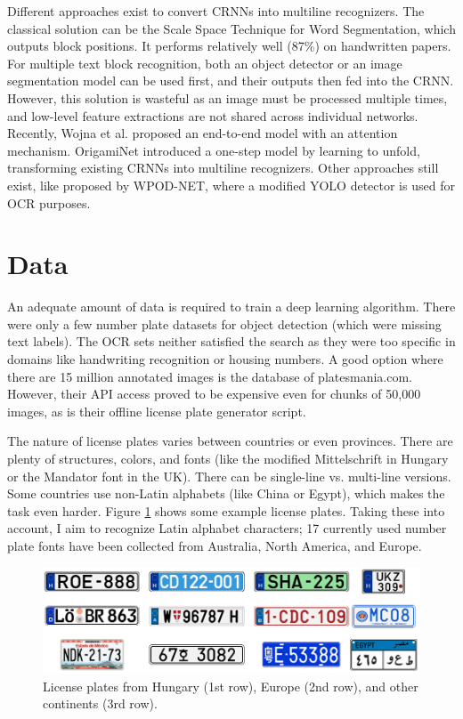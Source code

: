 Different approaches exist to convert CRNNs into multiline recognizers. The classical solution can be the Scale Space Technique for Word Segmentation\cite{ScaleWordSeg}, which outputs block positions. It performs relatively well (87\%) on handwritten papers. For multiple text block recognition, both an object detector or an image segmentation model can be used first, and their outputs then fed into the CRNN. However, this solution is wasteful as an image must be processed multiple times, and low-level feature extractions are not shared across individual networks. Recently, Wojna et al.\cite{Attention-basedExtract} proposed an end-to-end model with an attention mechanism. OrigamiNet\cite{OrigamiNet} introduced a one-step model by learning to unfold, transforming existing CRNNs into multiline recognizers. Other approaches still exist, like proposed by WPOD-NET\cite{WPOD-NET}, where a modified YOLO detector is used for OCR purposes.

\section{Data}

An adequate amount of data is required to train a deep learning algorithm. There were only a few number plate datasets for object detection (which were missing text labels). The OCR sets neither satisfied the search as they were too specific in domains like handwriting recognition or housing numbers. A good option where there are 15 million annotated images is the database of platesmania.com\cite{PlatesMania}. However, their API access proved to be expensive even for chunks of 50,000 images, as is their offline license plate generator script.

The nature of license plates varies between countries or even provinces. There are plenty of structures, colors, and fonts (like the modified Mittelschrift in Hungary or the Mandator font in the UK). There can be single-line vs. multi-line versions. Some countries use non-Latin alphabets (like China or Egypt), which makes the task even harder. Figure \ref{fig:plates} shows some example license plates. Taking these into account, I aim to recognize Latin alphabet characters; 17 currently used number plate fonts have been collected from Australia, North America, and Europe.

\begin{figure}[htb]
 \centerline{\includegraphics[width=1.0\columnwidth]{.//Figure/OCR/plates.png}}
 \caption{License plates from Hungary (1st row), Europe (2nd row), and other continents (3rd row).}
 \label{fig:plates}
\end{figure}

